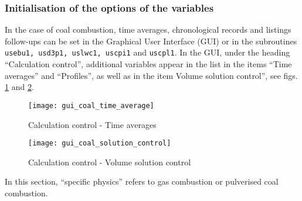{{\subsubsection{Initialisation of the options of the variables}
In the case of coal combustion, time averages, chronological records and listings follow-ups can be set in the Graphical User Interface (GUI) or in the subroutines \texttt{usebu1, usd3p1, uslwc1, uscpi1} and \texttt{uscpl1}. In the GUI, under the heading ``Calculation control'', additional variables appear in the list in the items ``Time averages'' and ``Profiles'', as well as in the item Volume solution control'', see figs. \ref{fig:t_average-coal} and \ref{fig:V_control-coal}.

\begin{figure}[!ht]
\begin{center}
\texttt{[image: gui\_coal\_time\_average]}
\caption{Calculation control - Time averages}
\label{fig:t_average-coal}
\end{center}
\end{figure}

\begin{figure}[!ht]
\begin{center}
\texttt{[image: gui\_coal\_solution\_control]}
\caption{Calculation control - Volume solution control}
\label{fig:V_control-coal}
\end{center}
\end{figure}

In this section, ``specific physics'' refers to gas combustion or
pulverised coal combustion.

}}
